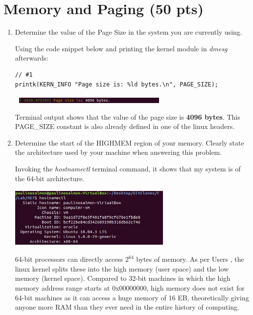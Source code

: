 \documentclass[conference]{IEEEtran}
\newcommand\tab[1][0.5cm]{\hspace*{#1}}
\begin{document}
\section{Memory and Paging (50 pts)}
\begin{enumerate}
\item Determine the value of the Page Size in the system you are currently using. 

\tab Using the code snippet below and printing the kernel module in \textit{dmesg} afterwards:
\begin{lstlisting}
// #1
printk(KERN_INFO "Page size is: %ld bytes.\n", PAGE_SIZE);
\end{lstlisting}
\begin{center}
	\includegraphics[width=8cm, height=0.3cm]{memory5.JPG}
\end{center}
\tab Terminal output shows that the value of the page size is \textbf{4096 bytes}. This PAGE\_SIZE constant is also already defined in one of the linux headers. \\


\item Determine the start of the HIGHMEM region of your memory. Clearly state the
architecture used by your machine when answering this problem. 

\tab Invoking the \textit{hostnamectl} terminal command, it shows that my system is of the 64-bit architecture.

\begin{center}
	\includegraphics[width=8cm, height=3cm]{memory6.JPG}
\end{center}

\tab 64-bit processors can directly access $2^{64}$ bytes of memory. As per Users \textcite{highmem}, the linux kernel splits these into the high memory (user space) and the low memory (kernel space). Compared to 32-bit machines in which the high memory address range starts at 0x00000000, high memory does not exist for 64-bit machines as it can access a huge memory of 16 EB, theoretically giving anyone more RAM than they ever need in the entire history of computing. \\


\end{enumerate}
\end{document}
